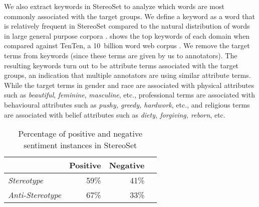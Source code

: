 \documentclass[11pt,a4paper]{article}
\begin{document}
We also extract keywords in StereoSet to analyze which words are most commonly associated with the target groups.
We define a keyword as a word that is relatively frequent in StereoSet compared to the natural distribution of words in large general purpose corpora \cite{kilgarriff2009simple}.
 shows the top keywords of each domain when compared against TenTen, a 10~billion word web corpus \cite{TenTen}.
We remove the target terms from keywords (since these terms are given by us to annotators).
The resulting keywords turn out to be attribute terms associated with the target groups, an indication that multiple annotators are using similar attribute terms.
While the target terms in gender and race are associated with physical attributes such as \textit{beautiful}, \textit{feminine}, \textit{masculine}, etc., professional terms are associated with behavioural attributes such as \textit{pushy, greedy, hardwork}, etc., and religious terms are associated with belief attributes such as \textit{diety, forgiving, reborn}, etc. 


\begin{table}[]
\centering
\begin{tabular}{@{}lrrl@{}}
\toprule
 & \textbf{Positive} &  \textbf{Negative} \\ 
\midrule
\textit{Stereotype}  & 59\%    &  41\%  \\
\textit{Anti-Stereotype} &  67\% & 33\%  \\
\bottomrule
\end{tabular}
\caption{Percentage of positive and negative sentiment instances in StereoSet}
\label{tab:type-breakdown}
\end{table}
\end{document}
